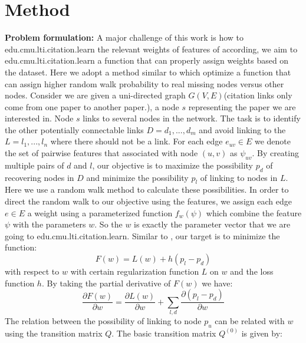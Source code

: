 \documentclass{article} %
\begin{document}
\section{Method}
\textbf{Problem formulation:} A major challenge of this work is how to edu.cmu.lti.citation.learn the relevant weights of features of according, we aim to edu.cmu.lti.citation.learn a function that can properly assign weights based on the dataset. Here we adopt a method similar to \cite{Backstrom:2011:SRW:1935826.1935914} which optimize a function that can assign higher random walk probability to real missing nodes versus other nodes. Consider we are given a uni-directed graph $G(V,E)$(citation links only come from one paper to another paper.), a node $s$ representing the paper we are interested in. Node $s$ links to several nodes in the network. The task is to identify the other potentially connectable links $D={d_1,...,d_m}$ and avoid linking to the $L={l_1,...,l_n}$ where there should not be a link. For each edge $e_{uv}\in E$ we denote the set of pairwise features that associated with node $(u,v)$ as $\psi_{uv}$. By creating multiple pairs of $d$ and $l$, our objective is to maximize the possibility $p_d$ of recovering nodes in $D$ and minimize the possibility $p_l$ of linking to nodes in $L$. \\
	Here we use a random walk method to calculate these possibilities. In order to direct the random walk to our objective using the features, we assign each edge $e \in E$ a weight using a parameterized function $f_w(\psi)$ which combine the feature $\psi$ with the parameters $w$. So the $w$ is exactly the parameter vector that we are going to edu.cmu.lti.citation.learn. Similar to \cite{Backstrom:2011:SRW:1935826.1935914}, our target is to minimize the function:
\begin{equation}
F(w)=L(w) + h(p_l - p_d)
\end{equation} 
with respect to $w$ with certain regularization function $L$ on $w$ and the loss function $h$. By taking the partial derivative of $F(w)$ we have:
\begin{equation}
\frac{\partial F(w)}{\partial w} = \frac{\partial L(w)}{\partial w} + \sum_{l,d} \frac{\partial(p_l-p_d)}{\partial w}
\end{equation}
	The relation between the possibility of linking to node $p_u$ can be related with $w$ using the transition matrix $Q$. The basic transition matrix $Q^{(0)}$ is given by:
\end{document}
